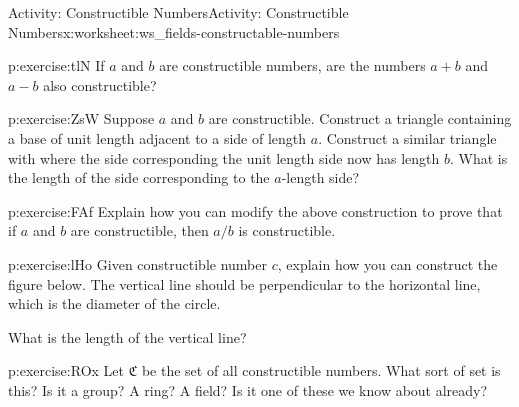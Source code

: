 \documentclass[11pt]{book}
\begin{document}
\begin{worksheet-subsection}{Activity: Constructible Numbers}{}{Activity: Constructible Numbers}{}{}{x:worksheet:ws_fields-constructable-numbers}
\begin{divisionexercise}{2}{}{}{p:exercise:tlN}
If \(a\) and \(b\) are constructible numbers, are the numbers \(a+b\) and \(a-b\) also constructible?%
\end{divisionexercise}%
\begin{divisionexercise}{3}{}{}{p:exercise:ZsW}%
Suppose \(a\) and \(b\) are constructible.  Construct a triangle containing a base of unit length adjacent to a side of length \(a\).  Construct a similar triangle with where the side corresponding the unit length side now has length \(b\).  What is the length of the side corresponding to the \(a\)-length side?%
\begin{image}{0.375}{0.25}{0.375}%
%
\end{image}%
\end{divisionexercise}%
\begin{divisionexercise}{4}{}{}{p:exercise:FAf}%
Explain how you can modify the above construction to prove that if \(a\) and \(b\) are constructible, then \(a/b\) is constructible.%
\end{divisionexercise}%
\begin{divisionexercise}{5}{}{}{p:exercise:lHo}%
Given constructible number \(c\), explain how you can construct the figure below.  The vertical line should be perpendicular to the horizontal line, which is the diameter of the circle.%
\begin{image}{0.35}{0.3}{0.35}%
%
\end{image}%
What is the length of the vertical line?%
\end{divisionexercise}%
\begin{divisionexercise}{6}{}{}{p:exercise:ROx}%
Let \(\mathfrak C\) be the set of all constructible numbers.  What sort of set is this?  Is it a group?  A ring?  A field?  Is it one of these we know about already?%
\end{divisionexercise}%
\end{worksheet-subsection}
\restoregeometry
\end{document}
